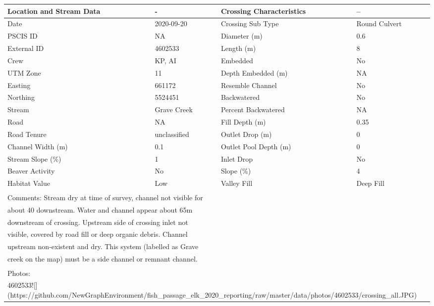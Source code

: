 \documentclass[
]{book}
\begin{document}
\begin{tabular}{l|l|l|l}
\hline
Location and Stream Data & - & Crossing Characteristics & --\\
\hline
Date & 2020-09-20 & Crossing Sub Type & Round Culvert\\
\hline
PSCIS ID & NA & Diameter (m) & 0.6\\
\hline
External ID & 4602533 & Length (m) & 8\\
\hline
Crew & KP, AI & Embedded & No\\
\hline
UTM Zone & 11 & Depth Embedded (m) & NA\\
\hline
Easting & 661172 & Resemble Channel & No\\
\hline
Northing & 5524451 & Backwatered & No\\
\hline
Stream & Grave Creek & Percent Backwatered & NA\\
\hline
Road & NA & Fill Depth (m) & 0.35\\
\hline
Road Tenure & unclassified & Outlet Drop (m) & 0\\
\hline
Channel Width (m) & 0.1 & Outlet Pool Depth (m) & 0\\
\hline
Stream Slope (\%) & 1 & Inlet Drop & No\\
\hline
Beaver Activity & No & Slope (\%) & 4\\
\hline
Habitat Value & Low & Valley Fill & Deep Fill\\
\hline
\multicolumn{4}{l}{\textsuperscript{} Comments: Stream dry at time of survey, channel not visible for}\\
\multicolumn{4}{l}{about 40 downstream. Water and channel appear about 65m}\\
\multicolumn{4}{l}{downstream of crossing. Upstream side of crossing inlet not}\\
\multicolumn{4}{l}{visible, covered by road fill or deep organic debris. Channel}\\
\multicolumn{4}{l}{upstream non-existent and dry. This system (labelled as Grave}\\
\multicolumn{4}{l}{creek on the map) must be a side channel or remnant channel.}\\
\multicolumn{4}{l}{\textsuperscript{} Photos:}\\
\multicolumn{4}{l}{4602533![](https://github.com/NewGraphEnvironment/fish\_passage\_elk\_2020\_reporting/raw/master/data/photos/4602533/crossing\_all.JPG)}\\
\end{tabular}
\end{document}
